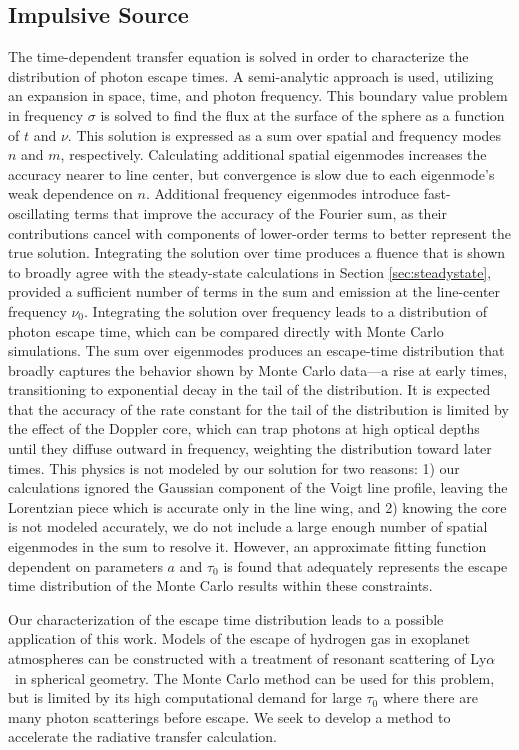 \documentclass[linenumbers]{aastex63}
\newcommand\lya{Ly$\alpha$\ }
\begin{document}
\subsection{Impulsive Source}
The time-dependent transfer equation is solved in order to characterize the distribution of photon escape times. A semi-analytic approach is used, utilizing an expansion in space, time, and photon frequency. This boundary value problem in frequency $\sigma$ is solved to find the flux at the surface of the sphere as a function of $t$ and $\nu$. This solution is expressed as a sum over spatial and frequency modes $n$ and $m$, respectively. Calculating additional spatial eigenmodes increases the accuracy nearer to line center, but convergence is slow due to each eigenmode's weak dependence on $n$. Additional frequency eigenmodes introduce fast-oscillating terms that improve the accuracy of the Fourier sum, as their contributions cancel with components of lower-order terms to better represent the true solution. Integrating the solution over time produces a fluence that is shown to broadly agree with the steady-state calculations in Section \ref{sec:steadystate}, provided a sufficient number of terms in the sum and emission at the line-center frequency $\nu_0$. Integrating the solution over frequency leads to a distribution of photon escape time, which can be compared directly with Monte Carlo simulations. The sum over eigenmodes produces an escape-time distribution that broadly captures the behavior shown by Monte Carlo data---a rise at early times, transitioning to exponential decay in the tail of the distribution. It is expected that the accuracy of the rate constant for the tail of the distribution is limited by the effect of the Doppler core, which can trap photons at high optical depths until they diffuse outward in frequency, weighting the distribution toward later times. This physics is not modeled by our solution for two reasons: 1) our calculations ignored the Gaussian component of the Voigt line profile, leaving the Lorentzian piece which is accurate only in the line wing, and 2) knowing the core is not modeled accurately, we do not include a large enough number of spatial eigenmodes in the sum to resolve it. However, an approximate fitting function dependent on parameters $a$ and $\tau_0$ is found that adequately represents the escape time distribution of the Monte Carlo results within these constraints.

Our characterization of the escape time distribution leads to a possible application of this work. Models of the escape of hydrogen gas in exoplanet atmospheres can be constructed with a treatment of resonant scattering of \lya in spherical geometry. The Monte Carlo method can be used for this problem, but is limited by its high computational demand for large $\tau_0$ where there are many photon scatterings before escape. We seek to develop a method to accelerate the radiative transfer calculation. 
\end{document}
